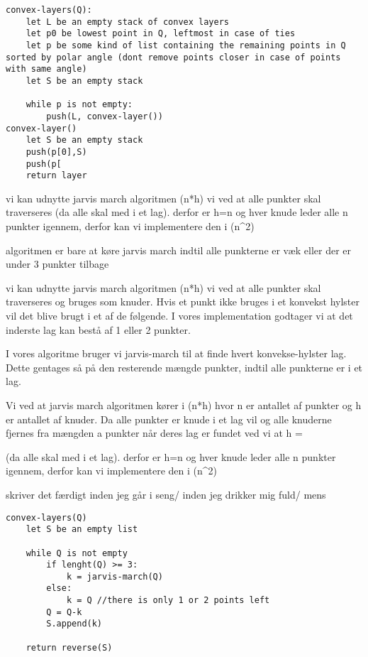 


\begin{verbatim}
convex-layers(Q):
    let L be an empty stack of convex layers
    let p0 be lowest point in Q, leftmost in case of ties
    let p be some kind of list containing the remaining points in Q sorted by polar angle (dont remove points closer in case of points with same angle)
    let S be an empty stack

    while p is not empty:
        push(L, convex-layer())
convex-layer()
    let S be an empty stack
    push(p[0],S)
    push(p[
    return layer
\end{verbatim}

vi kan udnytte jarvis march algoritmen \theta(n*h)
vi ved at alle punkter skal traverseres (da alle skal med i et lag).
 derfor er h=n
og hver knude leder alle n punkter igennem, derfor kan vi implementere den i \theta(n^2)

algoritmen er bare at køre jarvis march indtil alle punkterne er væk eller der er under 3 punkter tilbage

vi kan udnytte jarvis march algoritmen \theta(n*h)
vi ved at alle punkter skal traverseres og bruges som knuder. Hvis et punkt ikke bruges i et konvekst hylster vil det blive brugt i et af de følgende. 
I vores implementation godtager vi at det inderste lag kan bestå af 1 eller 2 punkter. 

I vores algoritme bruger vi jarvis-march til at finde hvert konvekse-hylster lag. Dette gentages så på den resterende mængde punkter, indtil alle punkterne er i et lag.

Vi ved at jarvis march algoritmen kører i \theta(n*h) hvor n er antallet af punkter og h er antallet af knuder. Da alle punkter er knude i et lag vil 
og  alle knuderne fjernes fra mængden a punkter når deres lag er fundet ved vi at h = 

(da alle skal med i et lag).
 derfor er h=n
og hver knude leder alle n punkter igennem, derfor kan vi implementere den i \theta(n^2)


skriver det færdigt inden jeg går i seng/ inden jeg drikker mig fuld/ mens
\begin{verbatim}
convex-layers(Q)
    let S be an empty list

    while Q is not empty
        if lenght(Q) >= 3:
            k = jarvis-march(Q)
        else:
            k = Q //there is only 1 or 2 points left
        Q = Q-k
        S.append(k)

    return reverse(S)
\end{verbatim}
